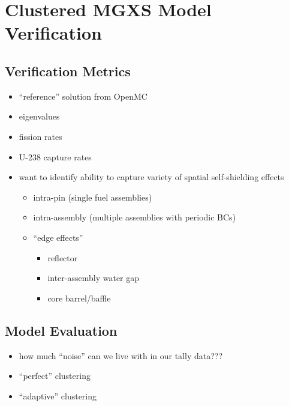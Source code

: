\chapter{Clustered MGXS Model Verification}
\label{chap:results}


\section{Verification Metrics}
\label{sec:chap7-verify}

\begin{itemize}[noitemsep]
  \item ``reference'' solution from OpenMC
  \item eigenvalues
  \item fission rates
  \item U-238 capture rates
  \item want to identify ability to capture variety of spatial self-shielding effects
  \begin{itemize}[noitemsep]
    \item intra-pin (single fuel assemblies)
    \item intra-assembly (multiple assemblies with periodic BCs)
    \item ``edge effects''
    \begin{itemize}[noitemsep]
      \item reflector
      \item inter-assembly water gap
      \item core barrel/baffle
    \end{itemize}
  \end{itemize}
\end{itemize}


\section{Model Evaluation}
\label{sec:chap7-evaluate}

\begin{itemize}[noitemsep]
  \item how much ``noise'' can we live with in our tally data???
  \item ``perfect'' clustering
  \item ``adaptive'' clustering
\end{itemize}


